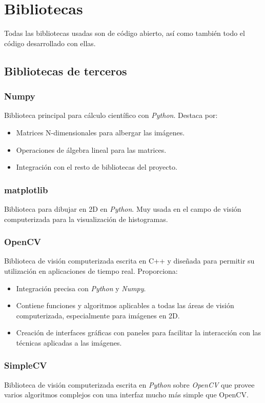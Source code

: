 \chapter{Bibliotecas}
Todas las bibliotecas usadas son de código abierto, así
como también todo el código desarrollado con ellas.

\section{Bibliotecas de terceros}
\subsection{Numpy}
Biblioteca principal para cálculo científico con \emph{Python}. Destaca por:
\begin{itemize}
\item Matrices N-dimensionales para albergar las imágenes.
\item Operaciones de álgebra lineal para las matrices.
\item Integración con el resto de bibliotecas del proyecto.
\end{itemize}

\subsection{matplotlib}
Biblioteca para dibujar en 2D en \emph{Python}. Muy usada en el campo de 
visión computerizada para la visualización de histogramas.

\subsection{OpenCV}
Biblioteca de visión computerizada escrita en C++ y diseñada para
permitir su utilización en aplicaciones de tiempo real. Proporciona:
\begin{itemize}
\item Integración precisa con \emph{Python} y \emph{Numpy}.
\item Contiene funciones y algoritmos aplicables a todas las áreas de
  visión computerizada, especialmente para imágenes en 2D.
\item Creación de interfaces gráficas con paneles para
  facilitar la interacción con las técnicas aplicadas a las imágenes.
\end{itemize}

\subsection{SimpleCV}
Biblioteca de visión computerizada escrita en \emph{Python} sobre
\emph{OpenCV} que provee varios algoritmos complejos con 
una interfaz mucho más simple que OpenCV\@.

